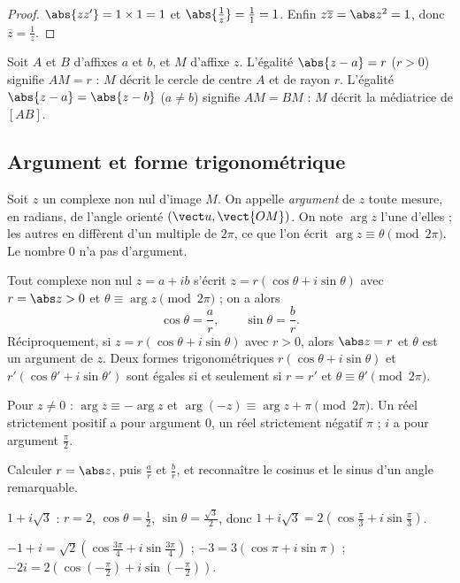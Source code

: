 \begin{proof}
$\abs{zz'}=1\times1=1$ et $\abs{\frac1z}=\frac11=1$. Enfin $z\overline z=\abs z^2=1$, donc $\overline z=\frac1z$.
\end{proof}
\begin{method}
Soit $A$ et $B$ d'affixes $a$ et $b$, et $M$ d'affixe $z$. L'égalité $\abs{z-a}=r$ ($r>0$) signifie $AM=r$ : $M$ décrit le cercle de centre $A$ et de rayon $r$. L'égalité $\abs{z-a}=\abs{z-b}$ ($a\neq b$) signifie $AM=BM$ : $M$ décrit la médiatrice de $[AB]$.
\end{method}

\subsection{Argument et forme trigonométrique}
\begin{definition}[Argument]
Soit $z$ un complexe non nul d'image $M$. On appelle \emph{argument} de $z$ toute mesure, en radians, de l'angle orienté $\left(\vect u,\vect{OM}\right)$. On note $\arg z$ l'une d'elles ; les autres en diffèrent d'un multiple de $2\pi$, ce que l'on écrit $\arg z\equiv\theta\pmod{2\pi}$. Le nombre $0$ n'a pas d'argument.
\end{definition}
\begin{theorem}
Tout complexe non nul $z=a+ib$ s'écrit $z=r(\cos\theta+i\sin\theta)$ avec $r=\abs z>0$ et $\theta\equiv\arg z\pmod{2\pi}$ ; on a alors
\[\cos\theta=\frac ar,\qquad\sin\theta=\frac br.\]
Réciproquement, si $z=r(\cos\theta+i\sin\theta)$ avec $r>0$, alors $\abs z=r$ et $\theta$ est un argument de $z$. Deux formes trigonométriques $r(\cos\theta+i\sin\theta)$ et $r'(\cos\theta'+i\sin\theta')$ sont égales si et seulement si $r=r'$ et $\theta\equiv\theta'\pmod{2\pi}$.
\end{theorem}
\begin{theorem}
Pour $z\neq0$ : $\arg\overline z\equiv-\arg z$ et $\arg(-z)\equiv\arg z+\pi\pmod{2\pi}$. Un réel strictement positif a pour argument $0$, un réel strictement négatif $\pi$ ; $i$ a pour argument $\frac\pi2$.
\end{theorem}
\begin{method}
Calculer $r=\abs z$, puis $\frac ar$ et $\frac br$, et reconnaître le cosinus et le sinus d'un angle remarquable.
\end{method}
\begin{example}
$1+i\sqrt3$ : $r=2$, $\cos\theta=\frac12$, $\sin\theta=\frac{\sqrt3}2$, donc $1+i\sqrt3=2\left(\cos\frac\pi3+i\sin\frac\pi3\right)$.\par
$-1+i=\sqrt2\left(\cos\frac{3\pi}4+i\sin\frac{3\pi}4\right)$ ; $-3=3(\cos\pi+i\sin\pi)$ ; $-2i=2\left(\cos\left(-\frac\pi2\right)+i\sin\left(-\frac\pi2\right)\right)$.
\end{example}
